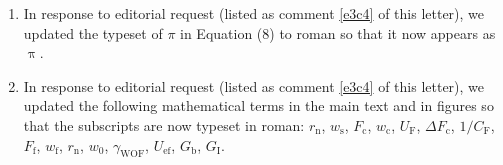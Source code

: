 \documentclass[11pt,letterpaper]{report}
\begin{document}
\begin{enumerate}[label=\textit{Ec.\arabic*}]



\item \label{Language5} In response to editorial request (listed as comment \ref{e3c4} of this letter), we updated the typeset of $\pi$ in Equation (8) to roman so that it now appears as $\uppi$.

\item \label{Language6} In response to editorial request (listed as comment \ref{e3c4} of this letter), we updated the following mathematical terms in the main text and in figures so that the subscripts are now typeset in roman: $r_\mathrm{n}$, $w_\mathrm{s}$, $F_\mathrm{c}$, $w_\mathrm{c}$, $U_\mathrm{F}$, $\Delta F_\mathrm{c}$, $1/C_\mathrm{F}$, $F_\mathrm{f}$, $w_\mathrm{f}$, $r_\mathrm{n}$, $w_\mathrm{0}$, $\gamma_\mathrm{WOF}$, $U_\mathrm{ef}$, $G_\mathrm{b}$, $G_\mathrm{I}$.



\end{enumerate}
\end{document}
